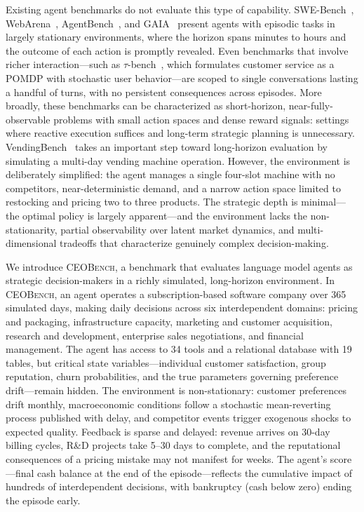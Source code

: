 Existing agent benchmarks do not evaluate this type of capability.
SWE-Bench~\citep{jimenez2024swebench}, WebArena~\citep{zhou2024webarena}, AgentBench~\citep{liu2024agentbench}, and GAIA~\citep{mialon2024gaia} present agents with episodic tasks in largely stationary environments, where the horizon spans minutes to hours and the outcome of each action is promptly revealed.
Even benchmarks that involve richer interaction---such as $\tau$-bench~\citep{yao2024taubench}, which formulates customer service as a POMDP with stochastic user behavior---are scoped to single conversations lasting a handful of turns, with no persistent consequences across episodes.
More broadly, these benchmarks can be characterized as short-horizon, near-fully-observable problems with small action spaces and dense reward signals: settings where reactive execution suffices and long-term strategic planning is unnecessary.
%
VendingBench~\citep{backlund2025vendingbench} takes an important step toward long-horizon evaluation by simulating a multi-day vending machine operation.
However, the environment is deliberately simplified: the agent manages a single four-slot machine with no competitors, near-deterministic demand, and a narrow action space limited to restocking and pricing two to three products.
The strategic depth is minimal---the optimal policy is largely apparent---and the environment lacks the non-stationarity, partial observability over latent market dynamics, and multi-dimensional tradeoffs that characterize genuinely complex decision-making.

We introduce \textsc{CEOBench}, a benchmark that evaluates language model agents as strategic decision-makers in a richly simulated, long-horizon environment.
In \textsc{CEOBench}, an agent operates a subscription-based software company over 365 simulated days, making daily decisions across six interdependent domains: pricing and packaging, infrastructure capacity, marketing and customer acquisition, research and development, enterprise sales negotiations, and financial management.
The agent has access to 34 tools and a relational database with 19 tables, but critical state variables---individual customer satisfaction, group reputation, churn probabilities, and the true parameters governing preference drift---remain hidden.
The environment is non-stationary: customer preferences drift monthly, macroeconomic conditions follow a stochastic mean-reverting process published with delay, and competitor events trigger exogenous shocks to expected quality.
Feedback is sparse and delayed: revenue arrives on 30-day billing cycles, R\&D projects take 5--30 days to complete, and the reputational consequences of a pricing mistake may not manifest for weeks.
The agent's score---final cash balance at the end of the episode---reflects the cumulative impact of hundreds of interdependent decisions, with bankruptcy (cash below zero) ending the episode early.

